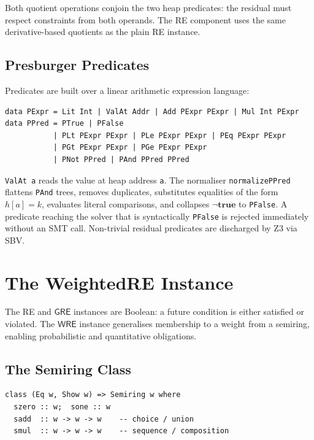 \documentclass[acmsmall,screen]{acmart}
\newcommand{\GRE}{\mathsf{GRE}}
\newcommand{\WRE}{\mathsf{WRE}}
\begin{document}
\noindent
Both quotient operations conjoin the two heap predicates: the residual must
respect constraints from both operands.
The RE component uses the same derivative-based quotients as the plain RE
instance.

\subsection{Presburger Predicates}

Predicates are built over a linear arithmetic expression language:
\begin{lstlisting}
data PExpr = Lit Int | ValAt Addr | Add PExpr PExpr | Mul Int PExpr
data PPred = PTrue | PFalse
           | PLt PExpr PExpr | PLe PExpr PExpr | PEq PExpr PExpr
           | PGt PExpr PExpr | PGe PExpr PExpr
           | PNot PPred | PAnd PPred PPred
\end{lstlisting}

\noindent
\lstinline{ValAt a} reads the value at heap address \lstinline{a}.
The normaliser \lstinline{normalizePPred} flattens \lstinline{PAnd} trees,
removes duplicates, substitutes equalities of the form $h[a]=k$, evaluates
literal comparisons, and collapses $\neg\mathbf{true}$ to \lstinline{PFalse}.
A predicate reaching the solver that is syntactically \lstinline{PFalse}
is rejected immediately without an SMT call.
Non-trivial residual predicates are discharged by Z3 via SBV.

\section{The WeightedRE Instance}
\label{sec:wre-instance}

The RE and $\GRE$ instances are Boolean: a future condition is either
satisfied or violated.
The $\WRE$ instance generalises membership to a weight from a semiring,
enabling probabilistic and quantitative obligations.

\subsection{The Semiring Class}

\begin{lstlisting}
class (Eq w, Show w) => Semiring w where
  szero :: w;  sone :: w
  sadd  :: w -> w -> w    -- choice / union
  smul  :: w -> w -> w    -- sequence / composition
\end{lstlisting}
\end{document}
